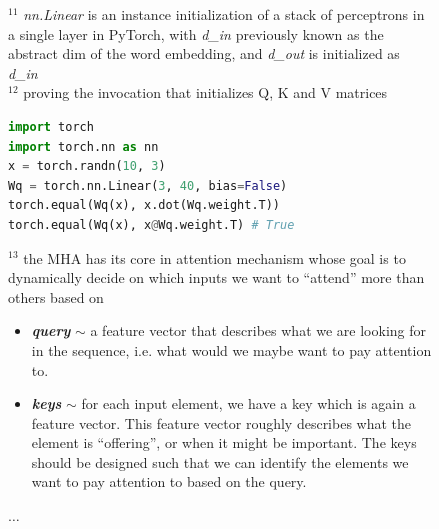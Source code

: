 \documentclass[12pt]{article}
\begin{document}
\begin{figure}[!htb]
\begin{minipage}[t]{0.65\textwidth}
\end{minipage}%
\hspace{25pt}
\begin{minipage}[t]{.4\textwidth}
  \raggedright
  \scriptsize 
  $^{11}$ {\it nn.Linear} is an instance initialization of a stack of perceptrons in a single layer in PyTorch, 
  with {\it d\_in} previously known as the abstract dim of the word embedding, and  {\it d\_out} is initialized 
  as {\it d\_in}\\
  \vspace{2em}
  $^{12}$ proving the invocation that initializes Q, K and V matrices
  \begin{lstlisting}[language=python,style=python,basicstyle=\ttfamily\tiny]
import torch
import torch.nn as nn
x = torch.randn(10, 3)
Wq = torch.nn.Linear(3, 40, bias=False)
torch.equal(Wq(x), x.dot(Wq.weight.T))
torch.equal(Wq(x), x@Wq.weight.T) # True
  \end{lstlisting}
  \vspace{2em}
  $^{13}$ the MHA has its core in attention mechanism whose goal is to dynamically decide on 
  which inputs we want to “attend” more than others based on 
  \begin{itemize}[left=0pt,topsep=0pt,itemsep=-1ex,parsep=0ex]
    \item \textbf{\textit{query}} {\tiny $\sim$} a feature vector that describes what we are looking for in the sequence, i.e. what would we maybe want to pay attention to.
    \item \textbf{\textit{keys}} {\tiny $\sim$} for each input element, we have a key which is again a feature vector. This feature vector roughly describes what 
    the element is “offering”, or when it might be important. The keys should be designed such that we can identify the elements we want to pay attention to based on the query.
  \end{itemize}
  $\ldots$
\end{minipage}
\end{figure}
\end{document}

